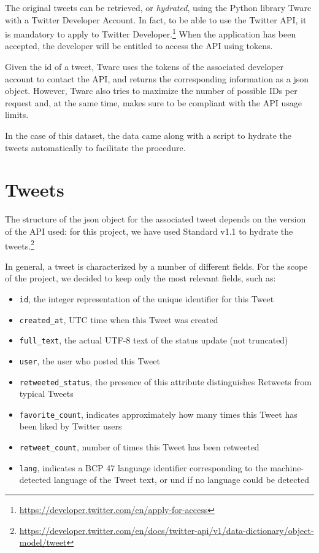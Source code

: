 The original tweets can be retrieved, or \textit{hydrated}, using the Python library Twarc with a Twitter Developer Account. In fact, to be able to use the Twitter API, it is mandatory to apply to Twitter Developer.\footnote{\url{https://developer.twitter.com/en/apply-for-access}} When the application has been accepted, the developer will be entitled to access the API using tokens. 

Given the id of a tweet, Twarc uses the tokens of the associated developer account to contact the API, and returns the corresponding information as a json object. However, Twarc also tries to maximize the number of possible IDs per request and, at the same time, makes sure to be compliant with the API usage limits.

In the case of this dataset, the data came along with a script to hydrate the tweets automatically to facilitate the procedure.

\section{Tweets}
\label{sec:tweets}
The structure of the json object for the associated tweet depends on the version of the API used: for this project, we have used Standard v1.1 to hydrate the tweets.\footnote{\url{https://developer.twitter.com/en/docs/twitter-api/v1/data-dictionary/object-model/tweet}}

In general, a tweet is characterized by a number of different fields. For the scope of the project, we decided to keep only the most relevant fields, such as:

\begin{itemize}
	\item \texttt{id}, the integer representation of the unique identifier for this Tweet
	\item \texttt{created\_at}, UTC time when this Tweet was created
	\item \texttt{full\_text}, the actual UTF-8 text of the status update (not truncated)
	\item \texttt{user}, the user who posted this Tweet
	\item \texttt{retweeted\_status}, the presence of this attribute distinguishes Retweets from typical Tweets
	\item \texttt{favorite\_count}, indicates approximately how many times this Tweet has been liked by Twitter users
	\item \texttt{retweet\_count}, number of times this Tweet has been retweeted
	\item \texttt{lang}, indicates a BCP 47 language identifier corresponding to the machine-detected language of the Tweet text, or und if no language could be detected
\end{itemize}

